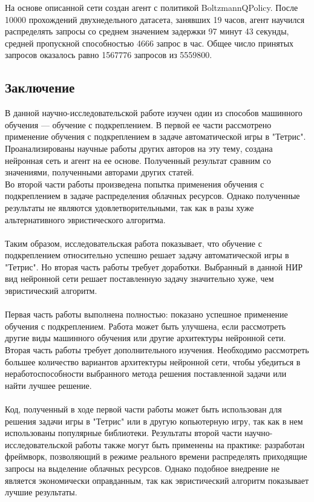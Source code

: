 \documentclass{article}
\begin{document}
На основе описанной сети создан агент с политикой BoltzmannQPolicy. После 10000 прохождений двухнедельного датасета, занявших 19 часов, агент научился распределять запросы со среднем значением задержки 97 минут 43 секунды, средней пропускной способностью 4666 запрос в час. Общее число принятых запросов оказалось равно 1567776 запросов из 5559800. 
\begin{center}
\section {Заключение}
\end{center}
В данной научно-исследовательской работе изучен один из способов машинного обучения — обучение с подкреплением. В первой ее части рассмотрено применение обучения с подкреплением в задаче автоматической игры в "Тетрис". Проанализированы научные работы других авторов на эту тему, создана нейронная сеть и агент на ее основе. Полученный результат сравним со значениями, полученными авторами других статей.\\
Во второй части работы произведена попытка применения обучения с подкреплением в задаче распределения облачных ресурсов. Однако полученные результаты не являются удовлетворительными, так как в разы хуже альтернативного эвристического алгоритма.\\
~\\
Таким образом, исследовательская работа показывает, что обучение с подкреплением относительно успешно решает задачу автоматической игры в "Тетрис". Но вторая часть работы требует доработки. Выбранный в данной НИР вид нейронной сети решает поставленную задачу значительно хуже, чем эвристический алгоритм.\\
~\\
Первая часть работы выполнена полностью: показано успешное применение обучения с подкреплением. Работа может быть улучшена, если рассмотреть другие виды машинного обучения или другие архитектуры нейронной сети. Вторая часть работы требует дополнительного изучения. Необходимо рассмотреть большее количество вариантов архитектуры нейронной сети, чтобы убедиться в неработоспособности выбранного метода решения поставленной задачи или найти лучшее решение.\\
~\\
Код, полученный в ходе первой части работы может быть использован для решения задачи игры в "Тетрис" или в другую копьютерную игру, так как в нем использованы популярные библиотеки. Результаты второй части научно-исследовательской работы также могут быть применены на практике: разработан фреймворк, позволяющий в режиме реального времени распределять приходящие запросы на выделение облачных ресурсов. Однако подобное внедрение не является экономически оправданным, так как эвристический алгоритм показывает лучшие результаты.\\
\end{document}
